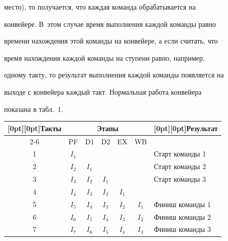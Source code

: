 место),  то получается, что каждая команда обрабатывается на 


конвейере. В~этом случае время выполнения каждой команды равно 


времени нахождения этой команды на конвейере, а если считать, что 


время нахождения каждой команды на ступени равно, например, 


одному такту, то результат выполнения каждой команды появляется на 


выходе с конвейера каждый такт. Нормальная работа конвейера 


показана в табл.~1.





\begin{table}\small


\begin{center}




\vspace*{2ex}





\begin{tabular}{|c|c|c|c|c|c|l|}


\hline


\multicolumn{1}{|c|}{\raisebox{-6pt}[0pt][0pt]{Такты}} 


&\multicolumn{5}{c|}{Этапы} &\multicolumn{1}{c|}{\raisebox{-6pt}[0pt][0pt]{Результат}}\\


\cline{2-6}


& PF  &   D1  &   D2 &  EX  &   WB&\\


\hline


 1  & $I_1$ & &&& & Старт команды 1\\


 2  & $I_2$ & $I_1$ &&&&  Старт  команды 2\\


 3  & $I_3$ & $I_2$ & $I_1$ &&&  Старт  команды 3 \\


 4  & $I_4$ & $I_3$ & $I_2$ & $I_1$ &&\\ 


 5  & $I_5$ & $I_4$ & $I_3$ & $I_2$ & $I_1$ & Финиш  команды 1\\


 6  & $I_6$ & $I_5$ & $I_4$ & $I_3$ & $I_2$ & Финиш  команды 2\\


 7  & $I_7$ & $I_6$ & $I_5$ & $I_4$ & $I_3$ & Финиш  команды 3\\


 \hline


 \end{tabular}


 \end{center}




 \end{table}
